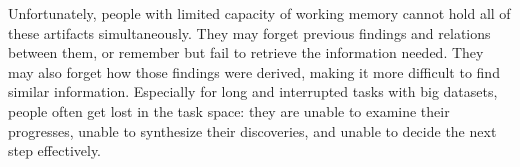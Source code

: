  Unfortunately, people with limited capacity of working memory cannot hold all of these artifacts simultaneously. They may forget previous findings and relations between them, or remember but fail to retrieve the information needed. They may also forget how those findings were derived, making it more difficult to find similar information. Especially for long and interrupted tasks with big datasets, people often get lost in the task space: they are unable to examine their progresses, unable to synthesize their discoveries, and unable to decide the next step effectively.




